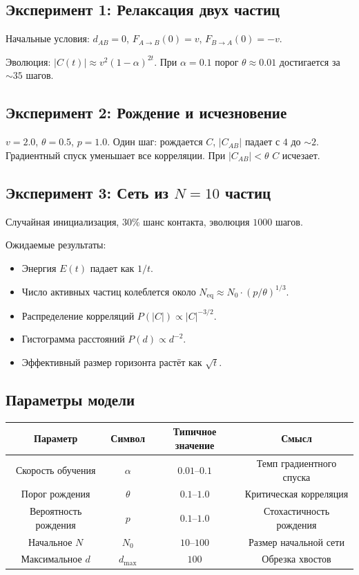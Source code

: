 \documentclass[11pt,a4paper]{article}
\theoremstyle{definition}
\begin{document}
\subsection{Эксперимент 1: Релаксация двух частиц}

Начальные условия: $d_{AB} = 0$, $F_{A \to B}(0) = v$, $F_{B \to A}(0) = -v$.

Эволюция: $|C(t)| \approx v^2 (1 - \alpha)^{2t}$. При $\alpha = 0.1$ порог $\theta \approx 0.01$ достигается за $\sim 35$ шагов.

\subsection{Эксперимент 2: Рождение и исчезновение}

$v = 2.0$, $\theta = 0.5$, $p = 1.0$. Один шаг: рождается $C$, $|C_{AB}|$ падает с $4$ до $\sim 2$. Градиентный спуск уменьшает все корреляции. При $|C_{AB}| < \theta$ $C$ исчезает.

\subsection{Эксперимент 3: Сеть из $N=10$ частиц}

Случайная инициализация, $30\%$ шанс контакта, эволюция $1000$ шагов.

Ожидаемые результаты:
\begin{itemize}
    \item Энергия $E(t)$ падает как $1/t$.
    \item Число активных частиц колеблется около $N_{\text{eq}} \approx N_0 \cdot (p/\theta)^{1/3}$.
    \item Распределение корреляций $P(|C|) \propto |C|^{-3/2}$.
    \item Гистограмма расстояний $P(d) \propto d^{-2}$.
    \item Эффективный размер горизонта растёт как $\sqrt{t}$.
\end{itemize}

\subsection{Параметры модели}

\begin{center}
\begin{tabular}{c|c|c|c}
Параметр & Символ & Типичное значение & Смысл \\
\hline
Скорость обучения & $\alpha$ & $0.01$--$0.1$ & Темп градиентного спуска \\
Порог рождения & $\theta$ & $0.1$--$1.0$ & Критическая корреляция \\
Вероятность рождения & $p$ & $0.1$--$1.0$ & Стохастичность рождения \\
Начальное $N$ & $N_0$ & $10$--$100$ & Размер начальной сети \\
Максимальное $d$ & $d_{\max}$ & $100$ & Обрезка хвостов
\end{tabular}
\end{center}
\end{document}
